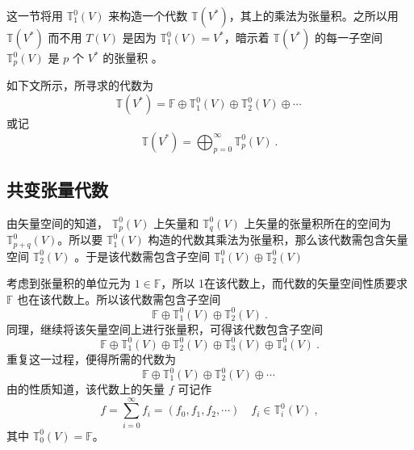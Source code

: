 
\begin{issues}
\end{issues}


这一节将用 $\mathbb T_1^0(V)$ 来构造一个代数 $\mathbb T(V^*)$，其上的乘法为张量积。之所以用 $\mathbb T(V^*)$ 而不用 $T(V)$ 是因为 $\mathbb T_1^0(V)=V^*$，暗示着 $\mathbb T(V^*)$ 的每一子空间 $\mathbb T_p^0(V)$ 是 $p$ 个 $V^*$ 的张量积 。 

如下文所示，所寻求的代数为
\begin{equation}
\mathbb T(V^*)=\mathbb F\oplus\mathbb T_1^0(V)\oplus\mathbb T_2^0(V)\oplus\cdots~
\end{equation}
或记
\begin{equation}
\mathbb T(V^*)=\bigoplus_{p=0}^\infty\mathbb T_p^0(V)~.
\end{equation}
\subsection{共变张量代数}
由矢量空间的知道， $\mathbb T_p^0(V)$ 上矢量和 $\mathbb T_q^0(V)$ 上矢量的张量积所在的空间为  $\mathbb T_{p+q}^0(V)$。所以要 $\mathbb T_1^0(V)$ 构造的代数其乘法为张量积，那么该代数需包含矢量空间 $\mathbb T_2^0(V)$ 。于是该代数需包含子空间 $\mathbb T_1^0(V)\oplus\mathbb T_2^0(V) $

 考虑到张量积的单位元为 $1\in\mathbb F$，所以 1在该代数上，而代数的矢量空间性质要求 $\mathbb F$ 也在该代数上。所以该代数需包含子空间
\begin{equation}
\mathbb F\oplus\mathbb T_1^0(V)\oplus\mathbb T_2^0(V) ~.
\end{equation} 
同理，继续将该矢量空间上进行张量积，可得该代数包含子空间
\begin{equation}
\mathbb F\oplus\mathbb T_1^0(V)\oplus\mathbb T_2^0(V)\oplus\mathbb T_3^0(V)\oplus\mathbb T_4^0(V)~.
\end{equation}
重复这一过程，便得所需的代数为
\begin{equation}
\mathbb F\oplus\mathbb T_1^0(V)\oplus\mathbb T_2^0(V)\oplus\cdots~
\end{equation}
由的性质知道，该代数上的矢量 $f$ 可记作
\begin{equation}\label{eq_TenAlg_5}
f=\sum_{i=0}^\infty f_i=(f_0,f_1,f_2,\cdots) \quad f_i\in\mathbb T_i^0(V)~,
\end{equation}
其中 $\mathbb T_0^0(V)=\mathbb F$。

